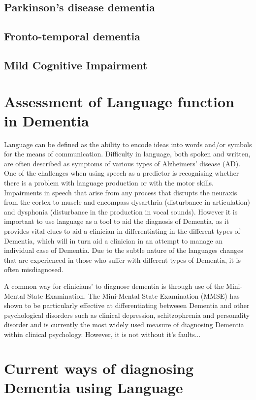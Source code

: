 \documentclass[a4paper]{article}
\begin{document}
\subsection{Parkinson's disease dementia}
\subsection{Fronto-temporal dementia}
\subsection{Mild Cognitive Impairment}

\section{Assessment of Language function in Dementia}

Language can be defined as the ability to encode ideas into words and/or symbols for the means of communication. Difficulty in language, both spoken and written, are often described as symptoms of various types of Alzheimers' disease (AD). One of the challenges when using speech as a predictor is recognising whether there is a problem with language production or with the motor skills. Impairments in speech that arise from any process that disrupts the neuraxis from the cortex to muscle and encompass dysarthria (disturbance in articulation) and dysphonia (disturbance in the production in vocal sounds). However it is important to use language as a tool to aid the diagnosis of Dementia, as it provides vital clues to aid a clinician in differentiating in the different types of Dementia, which will in turn aid a clinician in an attempt to manage an individual case of Dementia. Due to the subtle nature of the languages changes that are experienced in those who suffer with different types of Dementia, it is often misdiagnosed.



A common way for clinicians' to diagnose dementia is through use of the Mini-Mental State Examination. The Mini-Mental State Examination (MMSE) has shown to be particularly effective at differentiating betweeen Dementia and other psychological disorders such as clinical depression, schitzophrenia and personality disorder and is currently the most widely used measure of diagnosing Dementia within clinical psychology.  However, it is not without it's faults...

\section{Current ways of diagnosing Dementia using Language}
\end{document}
